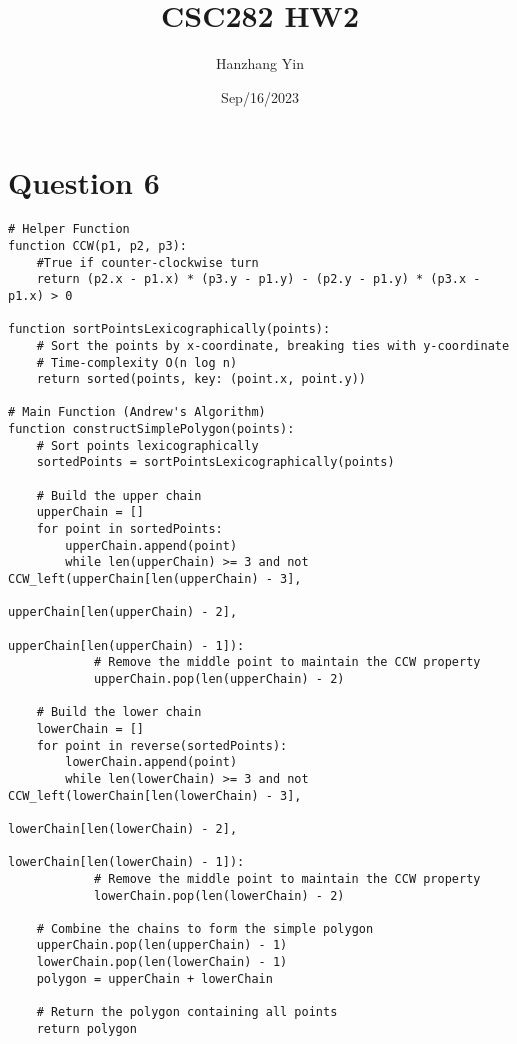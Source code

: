 \documentclass{article}
\title{CSC282 HW2}
\author{Hanzhang Yin}
\date{Sep/16/2023}
\begin{document}
\maketitle

\section*{Question 6}

\begin{verbatim}
# Helper Function
function CCW(p1, p2, p3):
    #True if counter-clockwise turn
    return (p2.x - p1.x) * (p3.y - p1.y) - (p2.y - p1.y) * (p3.x - p1.x) > 0  

function sortPointsLexicographically(points):
    # Sort the points by x-coordinate, breaking ties with y-coordinate
    # Time-complexity O(n log n)
    return sorted(points, key: (point.x, point.y))

# Main Function (Andrew's Algorithm)
function constructSimplePolygon(points):
    # Sort points lexicographically
    sortedPoints = sortPointsLexicographically(points)

    # Build the upper chain
    upperChain = []
    for point in sortedPoints:
        upperChain.append(point)
        while len(upperChain) >= 3 and not CCW_left(upperChain[len(upperChain) - 3],
                                                    upperChain[len(upperChain) - 2],
                                                    upperChain[len(upperChain) - 1]):
            # Remove the middle point to maintain the CCW property
            upperChain.pop(len(upperChain) - 2)

    # Build the lower chain
    lowerChain = []
    for point in reverse(sortedPoints):
        lowerChain.append(point)
        while len(lowerChain) >= 3 and not CCW_left(lowerChain[len(lowerChain) - 3],
                                                    lowerChain[len(lowerChain) - 2],
                                                    lowerChain[len(lowerChain) - 1]):
            # Remove the middle point to maintain the CCW property
            lowerChain.pop(len(lowerChain) - 2)

    # Combine the chains to form the simple polygon
    upperChain.pop(len(upperChain) - 1)
    lowerChain.pop(len(lowerChain) - 1)
    polygon = upperChain + lowerChain

    # Return the polygon containing all points
    return polygon
\end{verbatim}

\newpage
\end{document}
